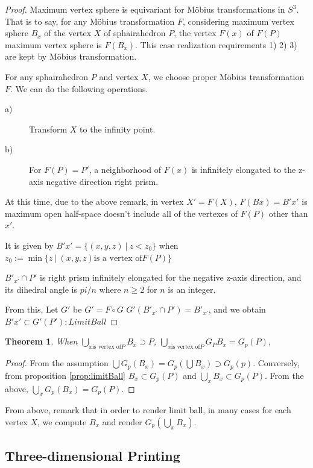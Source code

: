 \documentclass[suppldata, dvipdfmx]{interact}
\theoremstyle{plain}%
\newtheorem{theorem}{Theorem}[section]
\theoremstyle{definition}
\theoremstyle{remark}
\theoremstyle{problemstyle}
\begin{document}
\begin{proof}
 Maximum vertex sphere is equivariant for M\"obius transformations in
 $S^3$. That is to say, for any M\"obius transformation $F$,
 considering maximum vertex sphere $B_x$ of the vertex $X$ of
 sphairahedron $P$,
 the vertex $F(x)$ of $F(P)$ maximum vertex sphere is $F(B_x)$.
 This case realization requirements 1) 2) 3) are kept by M\"obius
 transformation. 

 For any sphairahedron $P$ and vertex $X$, we choose proper M\"obius
 transformation $F$. We can do the following operations.
 \begin{description}
  \item[a)] Transform $X$ to the infinity point.
  \item[b)] For $F(P)=P'$, a neighborhood of $F(x)$ is infinitely elongated
             to the z-axis negative direction right prism.
 \end{description}
 At this time, due to the above remark, in vertex $X' = F(X)$,
 $F(Bx) = B'x'$ is maximum open half-space doesn't include all of the
 vertexes of $F(P)$ other than $x'$.
 
 It is given by $B'x' = \{(x, y, z)~|~z < z_0\}$ when
 $z_0 := \min\{ z~|~(x, y, z) \text{is a vertex of} F(P) \}$

 $B'_{x'} \cap P'$ is right prism infinitely elongated for the negative
 z-axis direction, and its dihedral angle is $pi/n$ where $n \geq 2$
 for $n$ is an integer.

 From this, Let $G'$ be $G'=F \circ G$
 $G'(B'_{x'} \cap P') = B'_{x'}$, and
 we obtain $B'x' \subset G'(P') : Limit Ball$
\end{proof}

\begin{theorem}
 When $\bigcup_{x \text{is vertex of} P} B_x \supset P$,
 $\bigcup_{x \text{is vertex of} P} G_P{B_x} = G_{p}(P)$,
\end{theorem}

\begin{proof}
 From the assumption 
 $\bigcup G_p(B_x) = G_p (\bigcup B_x) \supset G_p(p)$.
 Conversely, from proposition \ref{prop:limitBall}
 $B_x \subset G_p(P)$ and $\bigcup_xB_x \subset G_p(P)$.
 From the above, $\bigcup_x G_p(B_x) = G_p(P)$.
\end{proof}
From above, remark that in order to render limit ball,
in many cases for each vertex $X$, we compute $B_x$ and render
$G_p(\bigcup_x B_x)$.


\subsection{Three-dimensional Printing}
\end{document}

